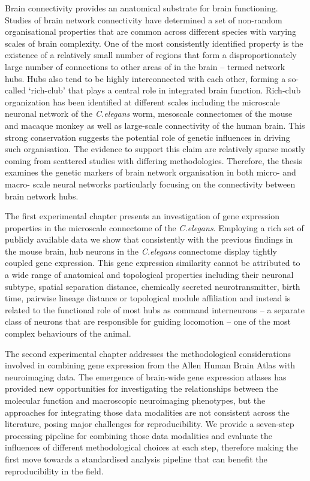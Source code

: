 
\vspace*{20mm}

\vspace{10mm}

Brain connectivity provides an anatomical substrate for brain functioning. Studies of brain network connectivity have determined a set of non-random organisational properties that are common across different species with varying scales of brain complexity. One of the most consistently identified property is the existence of a relatively small number of regions that form a disproportionately large number of connections to other areas of in the brain -- termed network hubs. Hubs also tend to be highly interconnected with each other, forming a so-called `rich-club' that plays a central role in integrated brain function. Rich-club organization has been identified at different scales including the microscale neuronal network of the \textit{C.elegans} worm, mesoscale connectomes of the mouse and macaque monkey as well as large-scale connectivity of the human brain. This strong conservation suggests the potential role of genetic influences in driving such organisation. The evidence to support this claim are relatively sparse mostly coming from scattered studies with differing methodologies. Therefore, the thesis examines the genetic markers of brain network organisation in both micro- and macro- scale neural networks particularly focusing on the connectivity between brain network hubs. 

The first experimental chapter presents an investigation of gene expression properties in the microscale connectome of the \textit{C.elegans}. Employing a rich set of publicly available data we show that consistently with the previous findings in the mouse brain, hub neurons in the \textit{C.elegans} connectome display tightly coupled gene expression. This gene expression similarity cannot be attributed to a wide range of anatomical and topological properties including their neuronal subtype, spatial separation distance, chemically secreted neurotransmitter, birth time, pairwise lineage distance or topological module affiliation and instead is related to the functional role of most hubs as command interneurons -- a separate class of neurons that are responsible for guiding locomotion -- one of the most complex behaviours of the animal. 

The second experimental chapter addresses the methodological considerations involved in combining gene expression from the Allen Human Brain Atlas with neuroimaging data. The emergence of brain-wide gene expression atlases has provided new opportunities for investigating the relationships between the molecular function and macroscopic neuroimaging phenotypes, but the approaches for integrating those data modalities are not consistent across the literature, posing major challenges for reproducibility. We provide a seven-step processing pipeline for combining those data modalities and evaluate the influences of different methodological choices at each step, therefore making the first move towards a standardised analysis pipeline that can benefit the reproducibility in the field. 

